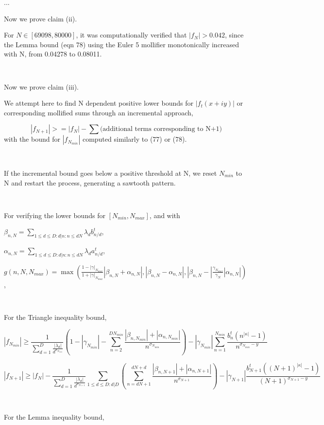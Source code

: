 ...


Now we prove claim (ii).

For $N \in [69098,80000]$, it was computationally verified that $|f_{N}| > 0.042$, since the Lemma bound (eqn 78) using the Euler 5 mollifier monotonically increased with N, from 0.04278 to 0.08011.

$ $
 

Now we prove claim (iii).

We attempt here to find N dependent positive lower bounds for $|f_{t}(x+iy)|$ or corresponding mollified sums through an incremental approach,

$$ |f_{N+1}| >= |f_{N}| - \sum \textrm{(additional terms corresponding to N+1)}$$
with the bound for $|f_{N_{min}}|$ computed similarly to (77) or (78).

$ $

If the incremental bound goes below a positive threshold at N, we reset $N_{min}$ to N and restart the process, generating a sawtooth pattern.

$ $

For verifying the lower bounds for $[N_{min},N_{max}]$, and with

$\beta_{n,N} = \sum\limits_{1 \leq d \leq D:d|n:n \leq dN} \lambda_{d} b_{n/d}^{t}$, 

$\alpha_{n,N} = \sum\limits_{1 \leq d \leq D:d|n:n \leq dN} \lambda_{d} a_{n/d}^{t}$,

$g(n,N,N_{max}) = \max(\frac{1-|\gamma|_{N_{max}}}{1+|\gamma|_{N_{max}}} |\beta_{n,N} + \alpha_{n,N}|, |\beta_{n,N} - \alpha_{n,N}|,  |\beta_{n,N} - |\frac{\gamma_{N_{max}}}{\gamma_{N}}| \alpha_{n,N}|)$,

$ $

For the Triangle inequality bound,

$$|f_{N_{min}}| \geq \frac{1}{\sum_{d=1}^D \frac{|\lambda_d|}{d^{\sigma_{N_{min}}}}} (1 - |\gamma_{N_{min}}| - \sum\limits_{n=2}^{DN_{min}} \frac{|\beta_{n,N_{min}}| + |\alpha_{n,N_{min}}|}{n^{\sigma_{N_{min}}}}) - |\gamma_{N_{min}}| \sum_{n=1}^{N_{min}} \frac{b_n^t (n^{|\kappa|} - 1)}{n^{\sigma_{N_{min}}-y}}$$


$$|f_{N+1}| \geq |f_{N}| - \frac{1}{\sum_{d=1}^D \frac{|\lambda_d|}{d^{\sigma_{N+1}}}} \sum\limits_{1 \leq d \leq D:d|D}(\sum\limits_{n=dN+1}^{dN+d} \frac{|\beta_{n,N+1}| + |\alpha_{n,N+1}|}{n^{\sigma_{N+1}}}) - |\gamma_{N+1}| \frac{b_{N+1}^t ({(N+1)}^{|\kappa|} - 1)}{(N+1)^{\sigma_{N+1}-y}}$$

$ $

For the Lemma inequality bound,


